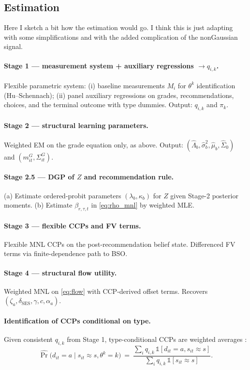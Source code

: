 \documentclass{article}
\begin{document}
\subsection{Estimation}

Here I sketch a bit how the estimation would go. I think this is just adapting \citet{arcidiacono2025college} with some simplifications and with the added complication of the nonGaussian signal.

\paragraph{Stage 1 — measurement system + auxiliary regressions $\to q_{i,k}$.} Flexible parametric system: (i) baseline measurements $M_i$ for $\theta^k$ identification (Hu--Schennach); (ii) panel auxiliary regressions on grades, recommendations, choices, and the terminal outcome with type dummies. Output: $q_{i,k}$ and $\pi_k$.

\paragraph{Stage 2 — structural learning parameters.} Weighted EM on the grade equation only, as above. Output: $(\hat\Lambda_b, \hat\sigma_b^2, \hat\mu_b, \hat\Sigma_0)$ and $(m^G_{it}, \Sigma^G_{it})$.

\paragraph{Stage 2.5 — DGP of $Z$ and recommendation rule.} (a) Estimate ordered-probit parameters $(\lambda_b, \kappa_b)$ for $Z$ given Stage-2 posterior moments. (b) Estimate $\beta_{r,\tau,t}$ in \eqref{eq:rho_mnl} by weighted MLE.

\paragraph{Stage 3 — flexible CCPs and FV terms.} Flexible MNL CCPs on the post-recommendation belief state. Differenced FV terms via finite-dependence path to BSO.

\paragraph{Stage 4 — structural flow utility.} Weighted MNL on \eqref{eq:flow} with CCP-derived offset terms. Recovers $(\zeta_a, \delta_{\mathrm{SES}}, \gamma, c, \alpha_a)$.

\paragraph{Identification of CCPs conditional on type.} Given consistent $q_{i,k}$ from Stage 1, type-conditional CCPs are weighted averages \citep{arcidiacono_miller_2011}:
\begin{equation*}
  \widehat{\Pr}\!\big(d_{it} = a \mid s_{it} \approx s, \theta^k = k\big)
  \ =\ \frac{\sum_i q_{i,k}\,\mathbb{1}[d_{it}=a, s_{it} \approx s]}{\sum_i q_{i,k}\,\mathbb{1}[s_{it} \approx s]}.
\end{equation*}
\end{document}
